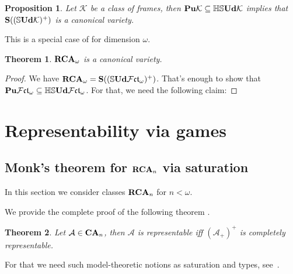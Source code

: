 \documentclass{article}
\theoremstyle{defin}
\theoremstyle{theorem}
\newtheorem{theorem}{Theorem}
\theoremstyle{claim}
\theoremstyle{prop}
\newtheorem{prop}{Proposition}
\theoremstyle{lemma}
\theoremstyle{fact}
\theoremstyle{remark}
\theoremstyle{ex}
\theoremstyle{col}
\theoremstyle{question}
\begin{document}
\begin{prop}
Let $\mathcal{K}$ be a class of frames, then ${\bf Pu}\mathcal{K} \subseteq \mathbb{H}\mathbb{S}{\bf Ud} \mathcal{K}$ implies that ${\bf S}((\mathbb{S}{\bf Ud} \mathcal{K})^+)$ is a canonical variety.
\end{prop}

This is a special case of \cite[Theorem 4.4]{goldblatt1995elementary} for dimension $\omega$.

\begin{theorem}
${\bf RCA}_{\omega}$ is a canonical variety.
\end{theorem}

\begin{proof}
We have ${\bf RCA}_{\omega} = {\bf S}((\mathbb{S} {\bf Ud} \mathcal{F}\mathfrak{ct}_{\omega})^+)$.
That's enough to show that ${\bf Pu} \mathcal{F}\mathfrak{ct}_{\omega} \subseteq \mathbb{HS} {\bf Ud} \mathcal{F}\mathfrak{ct}_{\omega}$.
For that, we need the following claim:

\end{proof}

\section{Representability via games}

\subsection{Monk's theorem for ${\bf RCA}_n$ via saturation}

In this section we consider classes ${\bf RCA}_n$ for $n < \omega$.

We provide the complete proof of the following theorem \cite[Theorem 3.4.3]{hirsch2013completions}.
\begin{theorem}\label{finitecanon}
Let $\mathcal{A} \in {\bf CA}_n$, then $\mathcal{A}$ is representable iff ${(\mathcal{A}_+)}^{+}$ is completely representable.
\end{theorem}

For that we need such model-theoretic notions as saturation and types, see~\cite[Section 6.3]{hodges1993model}.
\end{document}
